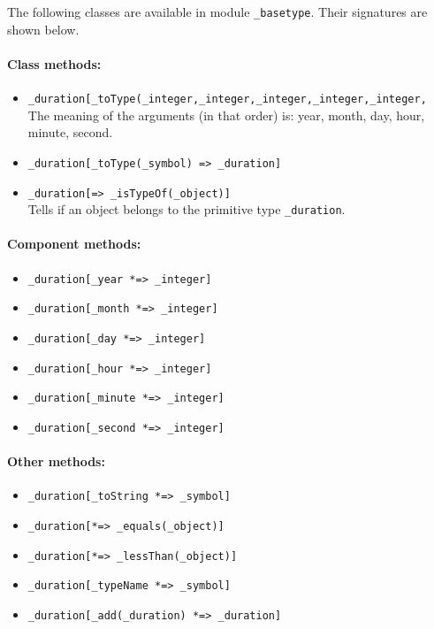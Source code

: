 \documentclass[11pt]{article}
\begin{document}
The following classes are available in module {\tt \_basetype}.
Their signatures are shown below.
\paragraph{Class methods:}
\begin{itemize}
\item
  {\tt \_duration[\_toType(\_integer,\_integer,\_integer,\_integer,\_integer,}
    \hspace*{5cm}{\tt \_integer) => \_duration]}
  \\
  The meaning of the arguments (in that order) is: year, month, day, hour, minute, second.
\item
  {\tt \_duration[\_toType(\_symbol) => \_duration]}
\item
  {\tt \_duration[=> \_isTypeOf(\_object)]}
  \\
  Tells if an object belongs to the primitive type {\tt \_duration}.  
\end{itemize}

\paragraph{Component methods:}
\begin{itemize}
      \item {\tt \_duration[\_year *=> \_integer]}  
      \item {\tt \_duration[\_month *=> \_integer]}  
      \item {\tt \_duration[\_day *=> \_integer]}  
      \item {\tt \_duration[\_hour *=> \_integer]}
      \item {\tt \_duration[\_minute *=> \_integer]}  
      \item {\tt \_duration[\_second *=> \_integer]}   
    \end{itemize}

\paragraph{Other methods:}
\begin{itemize}
\item {\tt \_duration[\_toString *=> \_symbol]}  
\item {\tt \_duration[*=> \_equals(\_object)]}  
\item {\tt \_duration[*=> \_lessThan(\_object)]}  
\item {\tt \_duration[\_typeName *=> \_symbol]}  
\item {\tt \_duration[\_add(\_duration) *=> \_duration]}  
\end{itemize}
\end{document}
